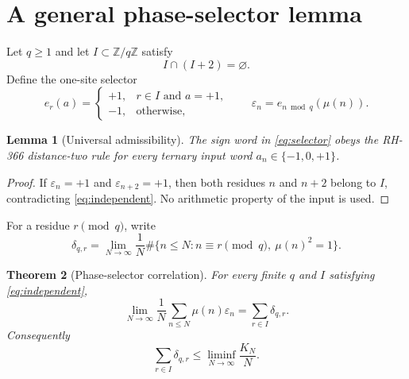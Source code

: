 \documentclass[11pt]{article}
\newtheorem{theorem}{Theorem}[section]
\newtheorem{lemma}[theorem]{Lemma}
\theoremstyle{definition}
\theoremstyle{remark}
\newcommand{\Mob}{\mu}
\newcommand{\Z}{\mathbb Z}
\newcommand{\eps}{\varepsilon}
\newcommand{\dd}{\delta}
\begin{document}
\section{A general phase-selector lemma}

Let $q\ge1$ and let $I\subset\Z/q\Z$ satisfy
\begin{equation}
             I\cap(I+2)=\varnothing .
\label{eq:independent}
\end{equation}
Define the one-site selector
\begin{equation}
 e_r(a)=
 \begin{cases}
 +1,&r\in I\text{ and }a=+1,\\
 -1,&\text{otherwise},
 \end{cases}
 \qquad
 \eps_n=e_{n\bmod q}(\Mob(n)).
 \label{eq:selector}
\end{equation}

\begin{lemma}[Universal admissibility]
The sign word in \eqref{eq:selector} obeys the RH-366 distance-two rule for
every ternary input word $a_n\in\{-1,0,+1\}$.
\end{lemma}

\begin{proof}
If $\eps_n=+1$ and $\eps_{n+2}=+1$, then both residues $n$ and $n+2$
belong to $I$, contradicting \eqref{eq:independent}.  No arithmetic property
of the input is used.
\end{proof}

For a residue $r\pmod q$, write
\begin{equation}
 \dd_{q,r}=\lim_{N\to\infty}\frac1N
 \#\{n\le N:n\equiv r\pmod q,\ \Mob(n)^2=1\}.
 \label{eq:delta-def}
\end{equation}

\begin{theorem}[Phase-selector correlation]
For every finite $q$ and $I$ satisfying \eqref{eq:independent},
\begin{equation}
 \lim_{N\to\infty}\frac1N\sum_{n\le N}\Mob(n)\eps_n
   =\sum_{r\in I}\dd_{q,r}.
 \label{eq:selector-limit}
\end{equation}
Consequently
\begin{equation}
 \sum_{r\in I}\dd_{q,r}
 \le \liminf_{N\to\infty}\frac{K_N}{N}.
 \label{eq:selector-floor}
\end{equation}
\end{theorem}
\end{document}
